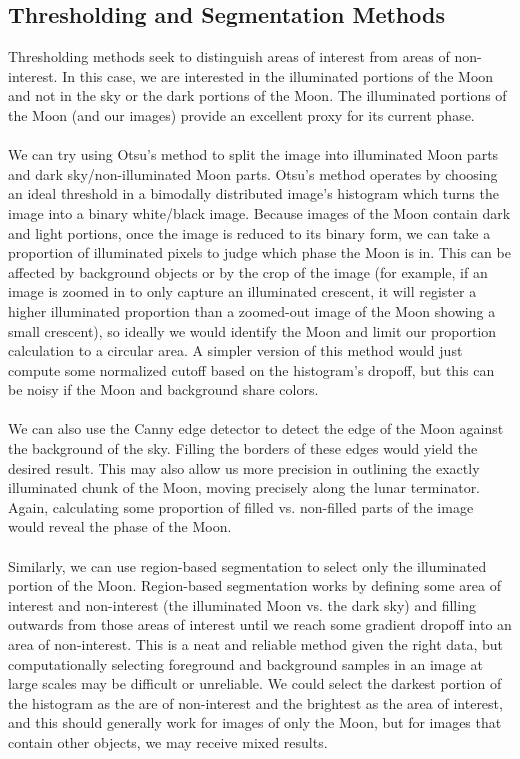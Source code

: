 \documentclass[]{article}
\begin{document}
\subsection*{Thresholding and Segmentation Methods}
Thresholding methods seek to distinguish areas of interest from areas of non-interest. In this case, we are interested in the illuminated portions of the Moon and not in the sky or the dark portions of the Moon. The illuminated portions of the Moon (and our images) provide an excellent proxy for its current phase.
\\\\
We can try using Otsu's method to split the image into illuminated Moon parts and dark sky/non-illuminated Moon parts. Otsu's method operates by choosing an ideal threshold in a bimodally distributed image's histogram which turns the image into a binary white/black image. Because images of the Moon contain dark and light portions, once the image is reduced to its binary form, we can take a proportion of illuminated pixels to judge which phase the Moon is in. This can be affected by background objects or by the crop of the image (for example, if an image is zoomed in to only capture an illuminated crescent, it will register a higher illuminated proportion than a zoomed-out image of the Moon showing a small crescent), so ideally we would identify the Moon and limit our proportion calculation to a circular area. A simpler version of this method would just compute some normalized cutoff based on the histogram's dropoff, but this can be noisy if the Moon and background share colors.
\\\\
We can also use the Canny edge detector to detect the edge of the Moon against the background of the sky. Filling the borders of these edges would yield the desired result. This may also allow us more precision in outlining the exactly illuminated chunk of the Moon, moving precisely along the lunar terminator. Again, calculating some proportion of filled vs. non-filled parts of the image would reveal the phase of the Moon.
\\\\
Similarly, we can use region-based segmentation to select only the illuminated portion of the Moon. Region-based segmentation works by defining some area of interest and non-interest (the illuminated Moon vs. the dark sky) and filling outwards from those areas of interest until we reach some gradient dropoff into an area of non-interest. This is a neat and reliable method given the right data, but computationally selecting foreground and background samples in an image at large scales may be difficult or unreliable. We could select the darkest portion of the histogram as the are of non-interest and the brightest as the area of interest, and this should generally work for images of only the Moon, but for images  that contain other objects, we may receive mixed results.
\end{document}
